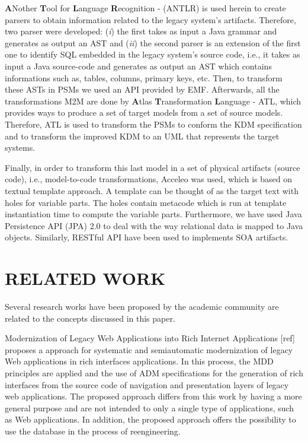 \documentclass[a4paper,twoside]{article}
\begin{document}
\textbf{A}Nother \textbf{T}ool for \textbf{L}anguage \textbf{R}ecognition -  (ANTLR) is used herein to create parsers to obtain information related to the legacy system's artifacts. Therefore, two parser were developed: (\textit{i}) the first takes as input a Java grammar and generates as output an AST and (\textit{ii}) the second parser is an extension of the first one to identify SQL embedded in the legacy system's source code, i.e., it takes as input a Java source-code and generates as output an AST which contains informations such as, tables, columns, primary keys, etc. Then, to transform these ASTs in PSMs we used an API provided by EMF. Afterwards, all the transformations M2M are done by \textbf{A}tlas \textbf{T}ransformation \textbf{L}anguage - ATL, which provides ways to produce a set of target models from a set of source models. Therefore, ATL is used to transform the PSMs to conform the KDM specification and to transform the improved KDM to an UML that represents the target systems. 

Finally, in order to transform this last model in a set of physical artifacts (source code), i.e., model-to-code transformations, Acceleo was used, which is based on textual template approach. A template can be thought of as the target text with holes for variable parts. The holes contain metacode which is run at template instantiation time to compute the variable parts. Furthermore, we have used Java Persistence API (JPA) 2.0 to deal with the way relational data is mapped to Java objects. Similarly, RESTful API have been used to implements SOA artifacts. 

\section{\uppercase{Related Work}}\label{sec:related_work}

Several research works have been proposed by the academic community are related to the concepts discussed in this paper.

Modernization of Legacy Web Applications into Rich Internet Applications [ref] proposes a approach for systematic and semiautomatic modernization of legacy Web applications in rich interfaces applications. In this process, the MDD principles are applied and the use of ADM specifications for the generation of rich interfaces from the source code of navigation and presentation layers of legacy web applications. The proposed approach differs from this work by having a more general purpose and are not intended to only a single type of applications, such as Web applications. In addition, the proposed approach offers the possibility to use the database in the process of reengineering.
\end{document}
